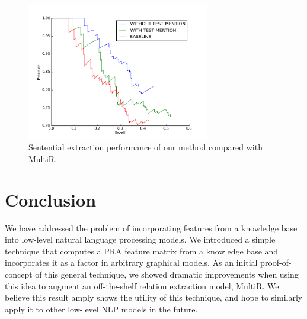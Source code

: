 \documentclass[11pt,a4paper]{article}
\begin{document}
\begin{figure}
  \centering
  \includegraphics[width=8cm,height=6cm]{senPR.png}
  \caption{Sentential extraction performance of our method compared with
  MultiR.}
  \label{fig:sentential-comparison}
\end{figure}

\section{Conclusion}

We have addressed the problem of incorporating features from a knowledge base
into low-level natural language processing models.  We introduced a simple
technique that computes a PRA feature matrix from a knowledge base and
incorporates it as a factor in arbitrary graphical models.  As an initial
proof-of-concept of this general technique, we showed dramatic improvements
when using this idea to augment an off-the-shelf relation extraction model,
MultiR.  We believe this result amply shows the utility of this technique, and
hope to similarly apply it to other low-level NLP models in the future.



\end{document}
